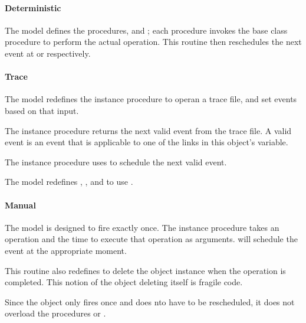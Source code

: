 \paragraph{Deterministic}
The model defines the procedures,  and ;
each procedure invokes the base class procedure to perform the actual operation.
This routine then reschedules the next event at
 or  respectively.

\paragraph{Trace}
The model redefines the instance procedure
to operan a trace file, and set events based on that input.

The instance procedure
returns the next valid event from the trace file.
A valid event is an event that is applicable to one of the links 
in this object's  variable.

The instance procedure
uses 
to schedule the next valid event.

The model redefines
,
, and
to use .

\paragraph{Manual}
The model is designed to fire exactly once.
The instance procedure
takes an operation and the time to execute that operation as arguments.
will schedule the event at the appropriate moment.

This routine also redefines
to delete the object instance when the operation is completed.
This notion of the object deleting itself is fragile code.

Since the object only fires once and does nto have to be rescheduled,
it does not overload the procedures  or .

